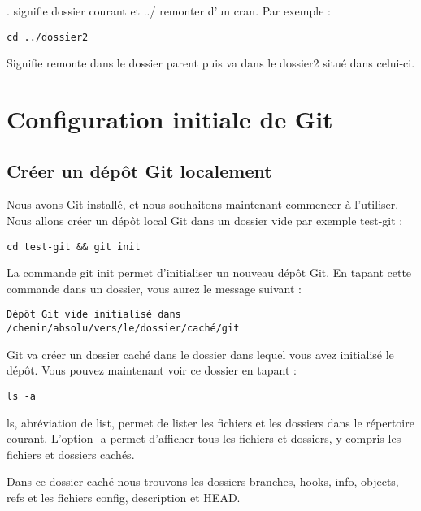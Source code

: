\documentclass{article}
\begin{document}
{\color{blue}.} signifie dossier courant et {\color{blue}../} remonter d'un cran. Par exemple :


\begin{verbatim}
cd ../dossier2
\end{verbatim}
Signifie remonte dans le dossier parent puis va dans le {\color{blue}dossier2} situé dans celui-ci.

\section{Configuration initiale de Git}
\subsection{Créer un dépôt {\color{blue}Git} localement}
Nous avons {\color{blue}Git} installé, et nous souhaitons maintenant commencer à l'utiliser. Nous allons créer un dépôt local {\color{blue}Git} dans un dossier vide par exemple {\color{blue}test-git} :

\begin{verbatim}
cd test-git && git init
\end{verbatim}

La commande {\color{blue}git init} permet d'initialiser un nouveau dépôt {\color{blue}Git}. En tapant cette commande dans un dossier, vous aurez le message suivant :
\begin{verbatim}
Dépôt Git vide initialisé dans /chemin/absolu/vers/le/dossier/caché/git
\end{verbatim}

{\color{blue}Git} va créer un dossier caché dans le dossier dans lequel vous avez initialisé le dépôt. Vous pouvez maintenant voir ce dossier en tapant :

\begin{verbatim}
ls -a
\end{verbatim}

{\color{blue}ls}, abréviation de {\color{blue}list}, permet de lister les fichiers et les dossiers dans le répertoire courant. L'option {\color{blue}-a} permet d'afficher tous les fichiers et dossiers, y compris les fichiers et dossiers cachés.

Dans ce dossier caché nous trouvons les dossiers {\color{blue}branches}, {\color{blue}hooks}, {\color{blue}info}, {\color{blue}objects}, {\color{blue}refs} et les fichiers {\color{blue}config}, {\color{blue}description} et {\color{blue}HEAD}.
\end{document}
